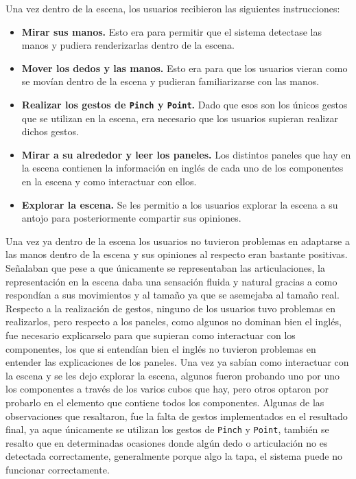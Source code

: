 \documentclass[a4paper, 12pt]{book}
\begin{document}
Una vez dentro de la escena, los usuarios recibieron las siguientes instrucciones: 

\begin{itemize}
  \item \textbf{Mirar sus manos.} Esto era para permitir que el sistema detectase las manos y pudiera renderizarlas dentro de la escena.
  \item \textbf{Mover los dedos y las manos.} Esto era para que los usuarios vieran como se movían dentro de la escena y pudieran familiarizarse con las manos.
  \item \textbf{Realizar los gestos de \texttt{Pinch} y \texttt{Point}.} Dado que esos son los únicos gestos que se utilizan en la escena, era necesario que los usuarios supieran realizar dichos gestos.
  \item \textbf{Mirar a su alrededor y leer los paneles.} Los distintos paneles que hay en la escena contienen la información en inglés de cada uno de los componentes en la escena y como interactuar con ellos.
  \item \textbf{Explorar la escena.} Se les permitio a los usuarios explorar la escena a su antojo para posteriormente compartir sus opiniones.
\end{itemize}

Una vez ya dentro de la escena los usuarios no tuvieron problemas en adaptarse a las manos dentro de la escena y sus opiniones al respecto eran bastante positivas. Señalaban que pese a que únicamente se representaban las articulaciones, la representación en la escena daba una sensación fluida y natural gracias a como respondían a sus movimientos y al tamaño ya que se asemejaba al tamaño real. 
Respecto a la realización de gestos, ninguno de los usuarios tuvo problemas en realizarlos, pero respecto a los paneles, como algunos no dominan bien el inglés, fue necesario explicarselo para que supieran como interactuar con los componentes, los que si entendían bien el inglés no tuvieron problemas en entender las explicaciones de los paneles. 
Una vez ya sabían como interactuar con la escena y se les dejo explorar la escena, algunos fueron probando uno por uno los componentes a través de los varios cubos que hay, pero otros optaron por probarlo en el elemento que contiene todos los componentes. 
Algunas de las observaciones que resaltaron, fue la falta de gestos implementados en el resultado final, ya aque únicamente se utilizan los gestos de \texttt{Pinch} y \texttt{Point}, también se resalto que en determinadas ocasiones donde algún dedo o articulación no es detectada correctamente, generalmente porque algo la tapa, el sistema puede no funcionar correctamente.
\end{document}
